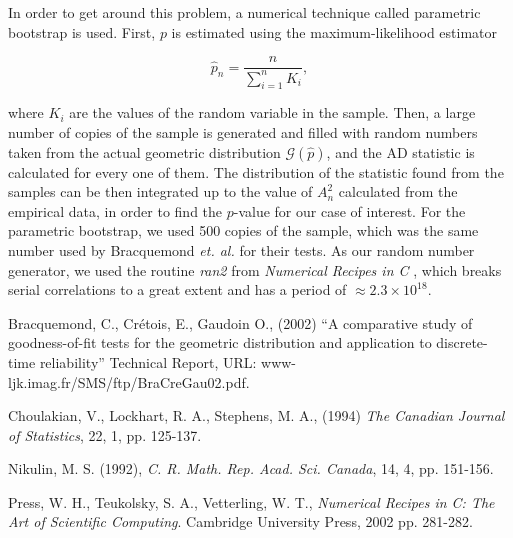 \documentclass[paper=letter, fontsize=12pt]{scrartcl}
\numberwithin{equation}{section}
\numberwithin{figure}{section}
\begin{document}
 In order to get around this problem, a numerical technique called parametric bootstrap is
 used. First, $p$ is estimated using the maximum-likelihood estimator
 
 \begin{equation}
 \label{eq_maximum_likelihood}
 \hat{p}_n=\frac{n}{\sum_{i=1}^n K_i},
 \end{equation}
 
 \noindent
 where $K_i$ are the values of the random variable in the sample.
 Then, a large number of copies of the sample is  generated and filled with random numbers
 taken from the actual geometric distribution $\mathcal{G}(\hat{p})$, and the AD statistic
 is calculated for every one of them.
 The distribution of the statistic found from the samples can be then integrated up to the
 value of $A_n^2$ calculated from the empirical data, in order to find the $p$-value for our
 case of interest.
 For the parametric bootstrap,  we used 500 copies of the sample,
 which was the same number used by Bracquemond {\it et. al.} \cite{BraCreGau} for their tests.
 As our random number generator, we used the routine {\it ran2} from
 {\it Numerical Recipes in C} \cite{Recipes}, which breaks serial correlations to a
 great extent and has a period of $\approx 2.3 \times 10^{18}$.



 
\begin{thebibliography}{3}
Bracquemond, C., Cr\'{e}tois, E., Gaudoin O., (2002)
``A comparative study of goodness-of-fit tests for the geometric distribution and application
to discrete-time reliability'' Technical Report, URL: www-ljk.imag.fr/SMS/ftp/BraCreGau02.pdf.

Choulakian, V., Lockhart, R. A., Stephens, M. A., (1994)
{\it The Canadian Journal of Statistics}, 22, 1, pp. 125-137. 

Nikulin, M. S. (1992),
{\it C. R. Math. Rep. Acad. Sci. Canada}, 14, 4, pp. 151-156.

Press, W. H., Teukolsky, S. A., Vetterling, W. T.,
{\it Numerical Recipes in C: The Art of Scientific Computing}.
Cambridge University Press, 2002 pp. 281-282.

\end{thebibliography}
\end{document}

